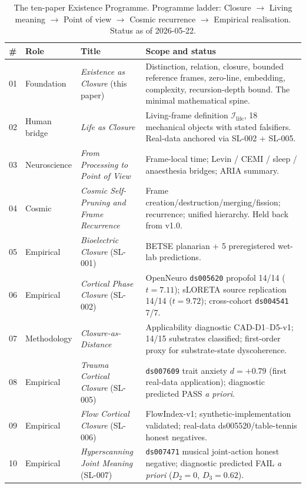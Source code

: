 \documentclass[11pt]{article}
\theoremstyle{plain}
\theoremstyle{definition}
\theoremstyle{remark}
\newcommand{\Ical}{\mathcal{I}}
\newcommand{\Ilife}{\Ical_{\mathrm{life}}}
\begin{document}
\begin{table}[h]
\centering
\footnotesize
\caption{The ten-paper Existence Programme. Programme ladder: Closure $\to$ Living meaning $\to$ Point of view $\to$ Cosmic recurrence $\to$ Empirical realisation. Status as of 2026-05-22.}\label{tab:programme-map}
\begin{tabular}{p{0.4cm}p{1.4cm}p{3.8cm}p{6.6cm}}
\toprule
\# & Role & Title & Scope and status \\
\midrule
01 & Foundation & \emph{Existence as Closure} (this paper) & Distinction, relation, closure, bounded reference frames, zero-line, embedding, complexity, recursion-depth bound. The minimal mathematical spine. \\
02 & Human bridge & \emph{Life as Closure} & Living-frame definition $\Ilife$, 18 mechanical objects with stated falsifiers. Real-data anchored via SL-002 + SL-005. \\
03 & Neuroscience & \emph{From Processing to Point of View} & Frame-local time; Levin / CEMI / sleep / anaesthesia bridges; ARIA summary. \\
04 & Cosmic & \emph{Cosmic Self-Pruning and Frame Recurrence} & Frame creation/destruction/merging/fission; recurrence; unified hierarchy. Held back from v1.0. \\
05 & Empirical & \emph{Bioelectric Closure} (SL-001) & BETSE planarian + 5 preregistered wet-lab predictions. \\
06 & Empirical & \emph{Cortical Phase Closure} (SL-002) & OpenNeuro \texttt{ds005620} propofol 14/14 ($t = 7.11$); sLORETA source replication 14/14 ($t = 9.72$); cross-cohort \texttt{ds004541} 7/7. \\
07 & Methodology & \emph{Closure-as-Distance} & Applicability diagnostic CAD-D1--D5-v1; 14/15 substrates classified; first-order proxy for substrate-state dyscoherence. \\
08 & Empirical & \emph{Trauma Cortical Closure} (SL-005) & \texttt{ds007609} trait anxiety $d = +0.79$ (first real-data application); diagnostic predicted PASS \emph{a priori}. \\
09 & Empirical & \emph{Flow Cortical Closure} (SL-006) & FlowIndex-v1; synthetic-implementation validated; real-data ds005520/table-tennis honest negatives. \\
10 & Empirical & \emph{Hyperscanning Joint Meaning} (SL-007) & \texttt{ds007471} musical joint-action honest negative; diagnostic predicted FAIL \emph{a priori} ($D_2 = 0$, $D_3 = 0.62$). \\
\bottomrule
\end{tabular}
\end{table}
\end{document}
